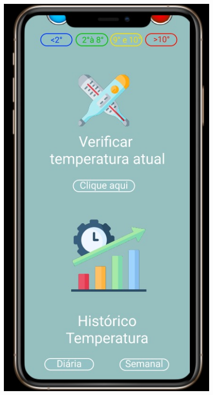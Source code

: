\begin{figure}
\begin{minipage}{0.5\textwidth}
            \includegraphics[height=0.4\textheight]{img/mobile/home.jpeg}
            \label{fig:mobileHome}
        \end{minipage}
    \end{figure}

